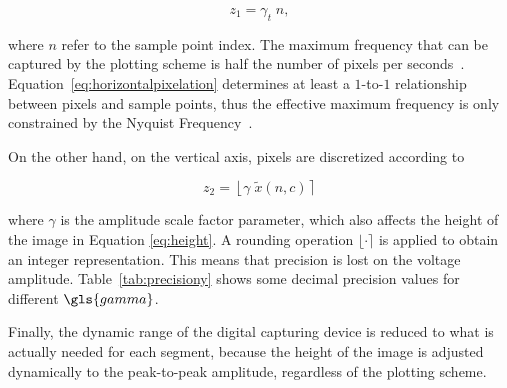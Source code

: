 \begin{equation}
z_1 = \gamma_t  \; n,
\label{eq:horizontalpixelation}
\end{equation}

\noindent where $n$ refer to the sample point index. The maximum frequency that can be captured by the plotting scheme is half the number of pixels per seconds~\cite{Schomer2010}.  Equation~\ref{eq:horizontalpixelation} determines at least a $1$-to-$1$ relationship between pixels and sample points, thus the effective maximum frequency is only constrained by the Nyquist Frequency~\cite{Oppenheim2009}. 

On the other hand, on the vertical axis, pixels are discretized according to

\begin{equation}
z_2 = \left \lfloor{ \gamma  \; \tilde{x}(n,c)  }\right \rceil
\label{eq:verticalpixelation}
\end{equation}

\noindent where $\gamma$ is the amplitude scale factor parameter, which also affects the height of the image in Equation \ref{eq:height}. A rounding operation $\lfloor  \cdot \rceil$ is applied to obtain an integer representation.  This means that precision is lost on the voltage amplitude.  Table~\ref{tab:precisiony} shows some decimal precision values for different $\gls{gamma}$.

Finally, the dynamic range of the digital capturing device is reduced to what is actually needed for each segment, because the height of the image is adjusted dynamically to the peak-to-peak amplitude, regardless of the plotting scheme.



